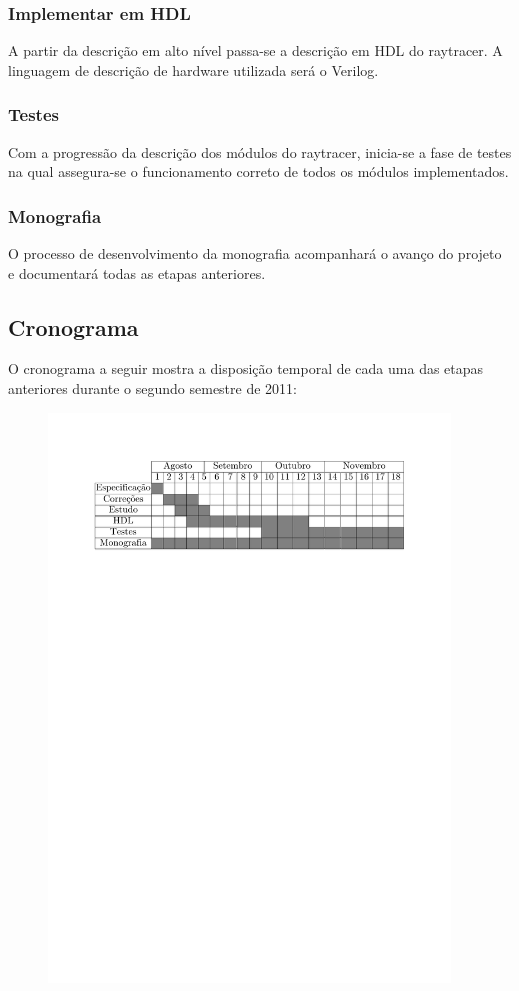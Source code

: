 \documentclass[a4paper,12pt]{article}
\begin{document}
\subsubsection{Implementar em HDL}
A partir da descrição em alto nível passa-se a descrição em HDL do raytracer. A linguagem de descrição de hardware utilizada será o Verilog.
\subsubsection{Testes}
Com a progressão da descrição dos módulos do raytracer, inicia-se a fase de testes na qual assegura-se o funcionamento correto de todos os módulos implementados.
\subsubsection{Monografia}
O processo de desenvolvimento da monografia acompanhará o avanço do projeto e documentará todas as etapas anteriores.
\subsection{Cronograma}
O cronograma a seguir mostra a disposição temporal de cada uma das etapas anteriores durante o segundo semestre de 2011:

\begin{figure}[h!]
  \centering
  \includegraphics[width=0.95\textwidth]{figures/gantt}
\end{figure}

\newpage


\end{document}
